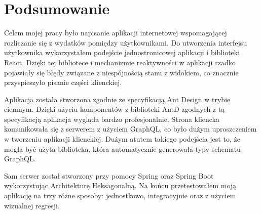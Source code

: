\documentclass[
    left=2.5cm,         %
    right=2.5cm,        %
    top=2.5cm,          %
    bottom=3cm,         %
    bindingoffset=6mm,  %
    nohyphenation=false %
]{eiti/eiti-thesis}
\begin{document}


\clearpage %
\section{Podsumowanie}          %
Celem mojej pracy było napisanie aplikacji internetowej wspomagającej rozliczanie się z wydatków pomiędzy użytkownikami. Do utworzenia interfejsu użytkownika wykorzystałem podejście jednostronicowej aplikacji i biblioteki React. Dzięki tej bibliotece i mechanizmie reaktywności w aplikacji rzadko pojawiały się błędy związane z niespójnością stanu z widokiem, co znacznie przyspieszyło pisanie części klienckiej.

Aplikacja została stworzona zgodnie ze specyfikacją Ant Design w trybie ciemnym. Dzięki użyciu komponentów z biblioteki AntD zgodnych z tą specyfikacją aplikacja wygląda bardzo profesjonalnie. Strona kliencka komunikowała się z serwerem z użyciem GraphQL, co było dużym uproszczeniem w tworzeniu aplikacji klienckiej. Dużym atutem takiego podejścia jest to, że mogła być użyta biblioteka, która automatycznie generowała typy schematu GraphQL.

 Sam serwer został stworzony przy pomocy Spring oraz Spring Boot wykorzystując Architekturę Heksagonalną. Na końcu przetestowałem moją aplikację na trzy różne sposoby: jednostkowo, integracyjnie oraz z użyciem wizualnej regresji.

\cleardoublepage %
\printbibliography


\newpage
\pagestyle{plain}

\vspace{0.8cm}

\listoffigurestoc     %
\vspace{1cm}          %
\lstlistoflistings    %
\vspace{1cm}          %

\end{document}

